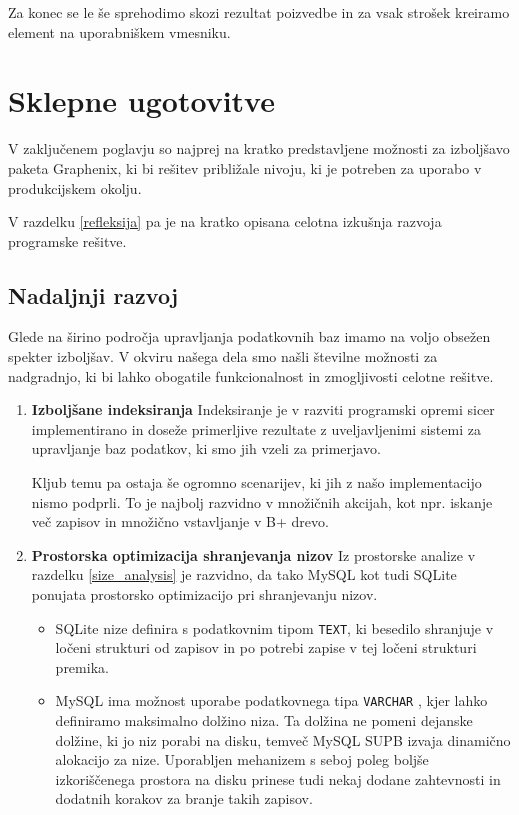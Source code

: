 \documentclass[a4paper,12pt,openright]{book}
\begin{document}
    \noindent
    Za konec se le še sprehodimo skozi rezultat poizvedbe in za vsak strošek kreiramo element na uporabniškem vmesniku.
    

\chapter{Sklepne ugotovitve}
    
    V zaključenem poglavju so najprej na kratko predstavljene možnosti za izboljšavo paketa Graphenix, ki bi rešitev približale nivoju, ki je potreben za uporabo v produkcijskem okolju.

    V razdelku \ref{refleksija} pa je na kratko opisana celotna izkušnja razvoja programske rešitve.
    
    \section{Nadaljnji razvoj}

    Glede na širino področja upravljanja podatkovnih baz imamo na voljo obsežen spekter izboljšav. V okviru našega dela smo našli številne možnosti za nadgradnjo, ki bi lahko obogatile funkcionalnost in zmogljivosti celotne rešitve.
    
    \begin{enumerate}
        \item \textbf{Izboljšane indeksiranja}
        \newline
        \noindent
        Indeksiranje je v razviti programski opremi sicer implementirano in doseže primerljive rezultate z uveljavljenimi sistemi za upravljanje baz podatkov, ki smo jih vzeli za primerjavo.

        Kljub temu pa ostaja še ogromno scenarijev, ki jih z našo implementacijo nismo podprli. To je najbolj razvidno v množičnih akcijah, kot npr. iskanje več zapisov in množično vstavljanje v B+ drevo.

        \newpage
        \item \textbf{Prostorska optimizacija shranjevanja nizov}
        \newline
        \noindent
        Iz prostorske analize v razdelku \ref{size_analysis} je razvidno, da tako MySQL kot tudi SQLite ponujata prostorsko optimizacijo pri shranjevanju nizov.
        \begin{itemize}
            \item SQLite nize definira s podatkovnim tipom {\tt TEXT}, ki besedilo shranjuje v ločeni strukturi od zapisov in po potrebi zapise v tej ločeni strukturi premika.
            \item MySQL ima možnost uporabe podatkovnega tipa {\tt VARCHAR} \cite{MYSQL_VARCHAR}, kjer lahko definiramo maksimalno dolžino niza. Ta dolžina ne pomeni dejanske dolžine, ki jo niz porabi na disku, temveč MySQL SUPB izvaja dinamično alokacijo za nize. Uporabljen mehanizem s seboj poleg boljše izkoriščenega prostora na disku prinese tudi nekaj dodane zahtevnosti in dodatnih korakov za branje takih zapisov.
        \end{itemize}
    \end{enumerate}
    
\end{document}
